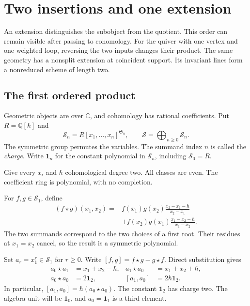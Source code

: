 \chapter{Two insertions and one extension}
\label{cyopen:chapter}

An extension distinguishes the subobject from the quotient.
This order can remain visible after passing to cohomology.
For the quiver with one vertex and one weighted loop, reversing
the two inputs changes their product.
The same geometry has a nonsplit extension at coincident support.
Its invariant lines form a nonreduced scheme of length two.

\section{The first ordered product}

Geometric objects are over $\mathbb C$, and cohomology has rational
coefficients. Put $R=\mathbb Q[\hbar]$ and
\[
 \mathcal S_n=R[x_1,\ldots,x_n]^{\mathfrak S_n},\qquad
 \mathcal S=\bigoplus_{n\geq0}\mathcal S_n.
\]
The symmetric group permutes the variables. The summand index $n$
is called the \emph{charge}. Write $\mathbf1_n$ for the constant
polynomial in $\mathcal S_n$, including $\mathcal S_0=R$.

Give every $x_i$ and $\hbar$ cohomological degree two.
All classes are even. The coefficient ring is polynomial, with no
completion.

For $f,g\in\mathcal S_1$, define
\begin{equation}\label{cyopen:eq:binary}
 \begin{split}
 (f\star g)(x_1,x_2)
 ={}&f(x_1)g(x_2)\frac{x_2-x_1-\hbar}{x_2-x_1}\\
 &+f(x_2)g(x_1)\frac{x_1-x_2-\hbar}{x_1-x_2}.
 \end{split}
\end{equation}
The two summands correspond to the two choices of a first root.
Their residues at $x_1=x_2$ cancel, so the result is a symmetric
polynomial.

Set $a_r=x_1^r\in\mathcal S_1$ for $r\geq0$.
Write $[f,g]=f\star g-g\star f$.
Direct substitution gives
\begin{equation}\label{cyopen:eq:first-products}
 \begin{aligned}
 a_0\star a_1&=x_1+x_2-\hbar,&
 a_1\star a_0&=x_1+x_2+\hbar,\\
 a_0\star a_0&=2\mathbf1_2,&
 [a_1,a_0]&=2\hbar\mathbf1_2.
 \end{aligned}
\end{equation}
In particular, $[a_1,a_0]=\hbar(a_0\star a_0)$.
The constant $\mathbf1_2$ has charge two. The algebra unit will be
$\mathbf1_0$, and $a_0=\mathbf1_1$ is a third element.

